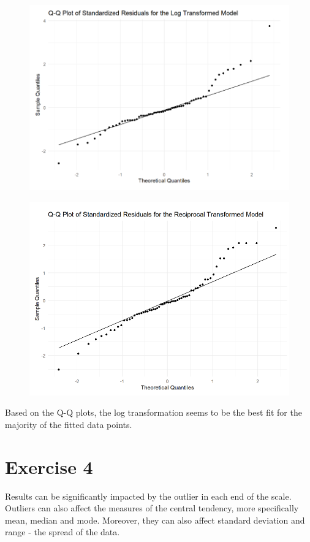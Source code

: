 \documentclass{article}
\begin{document}
\begin{figure}
    \includegraphics[width=\linewidth]{graphs/qq-log-time.png}
\end{figure}

\begin{figure}
    \includegraphics[width=\linewidth]{graphs/qq-reciprocal.png}
\end{figure}

Based on the Q-Q plots, the log transformation seems to be the best fit for the majority of the fitted data points.

\section{Exercise 4}
Results can be significantly impacted by the outlier in each end of the scale. Outliers can also affect the measures of the central tendency, more specifically mean, median and mode. Moreover, they can also affect standard deviation and range - the spread of the data.
\end{document}
